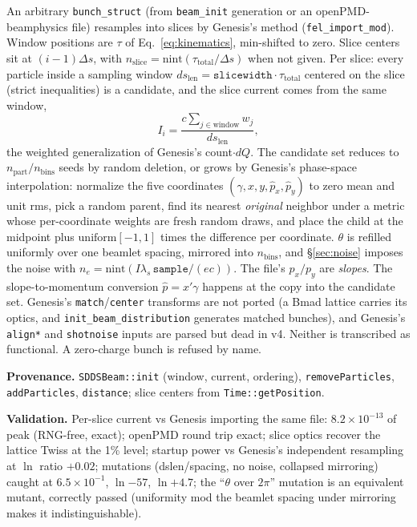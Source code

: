 \documentclass[11pt]{article}
\newcommand{\code}[1]{\texttt{#1}}
\newenvironment{provenance}{\par\small\textbf{Provenance.}}{\par}
\newenvironment{validation}{\par\small\textbf{Validation.}}{\par}
\begin{document}
An arbitrary \code{bunch\_struct} (from \code{beam\_init} generation or an
openPMD-beamphysics file) resamples into slices by Genesis's method
(\code{fel\_import\_mod}). Window positions are $\tau$ of Eq.~\ref{eq:kinematics},
min-shifted to zero. Slice centers sit at $(i-1)\Delta s$, with
$n_{\mathrm{slice}} = \mathrm{nint}(\tau_{\mathrm{total}}/\Delta s)$ when not given.
Per slice: every particle inside a sampling window $d s_{\mathrm{len}} =
\code{slicewidth}\cdot\tau_{\mathrm{total}}$ centered on the slice (strict
inequalities) is a candidate, and the slice current comes from the same window,
\begin{equation}\label{eq:importcurrent}
  I_i = \frac{c\sum_{j\in\mathrm{window}} w_j}{d s_{\mathrm{len}}},
\end{equation}
the weighted generalization of Genesis's count$\cdot dQ$. The candidate set reduces to
$n_{\mathrm{part}}/n_{\mathrm{bins}}$ seeds by random deletion, or grows by Genesis's
phase-space interpolation: normalize the five coordinates $(\gamma,x,y,\hat p_x,
\hat p_y)$ to zero mean and unit rms, pick a random parent, find its nearest
\emph{original} neighbor under a metric whose per-coordinate weights are fresh random
draws, and place the child at the midpoint plus $\mathrm{uniform}[-1,1]$ times the
difference per coordinate. $\theta$ is refilled uniformly over one beamlet spacing,
mirrored into $n_{\mathrm{bins}}$, and \S\ref{sec:noise} imposes the noise with
$n_e = \mathrm{nint}(I\lambda_s\,\code{sample}/(e c))$. The file's $p_x/p_y$ are
\emph{slopes}. The slope-to-momentum conversion $\hat p = x'\gamma$ happens at the
copy into the candidate set. Genesis's \code{match}/\code{center} transforms are not
ported (a Bmad lattice carries its optics, and \code{init\_beam\_distribution}
generates matched bunches), and Genesis's \code{align*} and \code{shotnoise} inputs
are parsed but dead in v4. Neither is transcribed as functional. A zero-charge bunch
is refused by name.

\begin{provenance}
\code{SDDSBeam::init} (window, current, ordering), \code{removeParticles},
\code{addParticles}, \code{distance}; slice centers from \code{Time::getPosition}.
\end{provenance}
\begin{validation}
Per-slice current vs Genesis importing the same file: $8.2\times10^{-13}$ of peak
(RNG-free, exact); openPMD round trip exact; slice optics recover the lattice Twiss at
the 1\% level; startup power vs Genesis's independent resampling at $\ln$ ratio
$+0.02$; mutations (dslen/spacing, no noise, collapsed mirroring) caught at
$6.5\times10^{-1}$, $\ln{-57}$, $\ln{+4.7}$; the ``$\theta$ over $2\pi$'' mutation is
an equivalent mutant, correctly passed (uniformity mod the beamlet spacing under mirroring makes it indistinguishable).
\end{validation}
\end{document}
